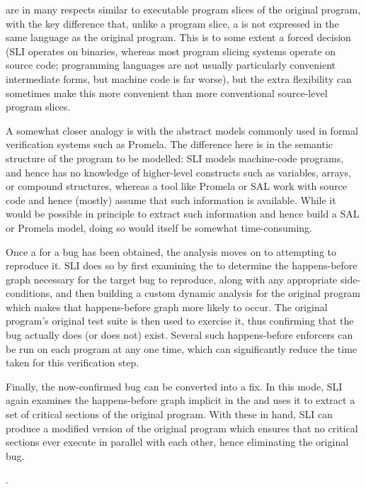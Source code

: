 \STateMachines are in many respects similar to executable program
slices of the original program, with the key difference that, unlike a
program slice, a \StateMachine is not expressed in the same language
as the original program.  This is to some extent a forced decision
(SLI operates on binaries, whereas most program slicing systems
operate on source code; programming languages are not usually
particularly convenient intermediate forms, but machine code is far
worse), but the extra flexibility can sometimes make this more
convenient than more conventional source-level program
slices.

A somewhat closer analogy is with the abstract models commonly used in
formal verification systems such as Promela\needCite{}.  The
difference here is in the semantic structure of the program to be
modelled: SLI models machine-code programs, and hence has no knowledge
of higher-level constructs such as variables, arrays, or compound
structures, whereas a tool like Promela or SAL\needCite{} work with
source code and hence (mostly) assume that such information is
available.  While it would be possible in principle to extract such
information and hence build a SAL or Promela model, doing so would
itself be somewhat time-consuming.

Once a \StateMachine for a bug has been obtained, the analysis moves
on to attempting to reproduce it.  SLI does so by first examining the
\StateMachine to determine the happens-before graph necessary for the
target bug to reproduce, along with any appropriate side-conditions,
and then building a custom dynamic analysis for the original program
which makes that happens-before graph more likely to occur.  The
original program's original test suite is then used to exercise it,
thus confirming that the bug actually does (or does not) exist.
Several such happens-before enforcers can be run on each program at
any one time, which can significantly reduce the time taken for this
verification step.

Finally, the now-confirmed bug can be converted into a fix.  In this
mode, SLI again examines the happens-before graph implicit in the
\StateMachine and uses it to extract a set of critical sections of the
original program.  With these in hand, SLI can produce a modified
version of the original program which ensures that no critical
sections ever execute in parallel with each other, hence eliminating
the original bug.

.

